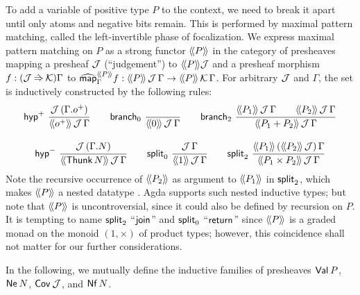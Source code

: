 \documentclass[a4paper,USenglish,cleveref, autoref]{lipics-v2019}
\begin{document}
To add a variable of positive type $P$ to the context, we need to
break it apart until only atoms and negative bits remain.  This is
performed by maximal pattern matching, called the left-invertible
phase of focalization.
We express maximal pattern matching on $P$ as a strong functor
$\Add P$ in the category of presheaves
mapping a presheaf $\J$ (``judgement'') to $\Add P \J$
and a presheaf morphism $f : (\J \hatto \K)\Gamma$ to
$\stmap[\Add P]_\Gamma f : \AddHyp P \J \Gamma \to \AddHyp P \K \Gamma$.
For arbitrary $\J$ and $\Gamma$, the set  is
inductively constructed by the following rules:
\begin{gather*}
  \nru{\phyp}
      {\J\,(\cext \Gamma \patom)}
      {\AddHyp {\patom} \J \Gamma}
\qquad
  \nru{\nbranch}
      {}
      {\AddHyp {\tyzero} \J \Gamma}
\qquad
  \nru{\bbranch}
      {\AddHyp {P_1} \J \Gamma \qquad
       \AddHyp {P_2} \J \Gamma }
      {\AddHyp {P_1 + P_2} \J \Gamma}
\\[2ex]
  \nru{\nhyp}
      {\J\,(\cext \Gamma N)}
      {\AddHyp {\Thunk N} \J \Gamma}
\qquad
  \nru{\nsplit}
      {\J\,\Gamma}
      {\AddHyp {\tyone} \J \Gamma}
\qquad
  \nru{\bsplit}
      {\AddHyp {P_1} {(\Add{P_2}\,\J)} \Gamma}
      {\AddHyp {P_1 \times P_2} \J \Gamma}
\end{gather*}
Note the recursive occurrence of $\Add{P_2}$ as argument to
$\Add{P_1}$ in $\bsplit$, which makes $\Add P$ a nested datatype
\cite{bird:nested}.  Agda supports such nested inductive types; but
note that $\Add{P}$ is uncontroversial, since it could also be defined
by recursion on $P$.   It is tempting to name $\bsplit$
``$\tjoin$'' and $\nsplit$ ``$\treturn$''
since $\Add P$ is a graded monad on the monoid $(1,\times)$
of product types;
however, this coincidence shall not matter for our further considerations.

In the following, we mutually define the inductive families of
presheaves $\tVal\,P$,
$\tNe\,N$, $\Cov\,\J$,
and $\tNf\,N$.
\end{document}
